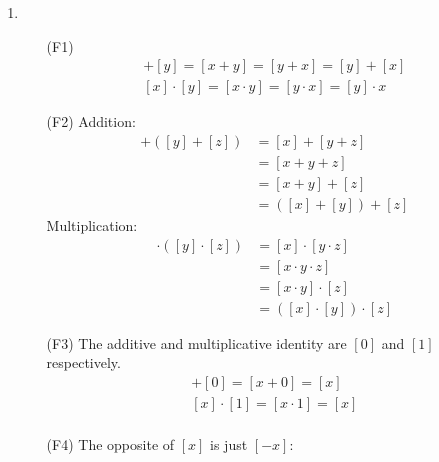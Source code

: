 \documentclass[12pt]{article}
\begin{document}
\begin{enumerate}
\begin{enumerate}
\begin{enumerate}
                    \end{enumerate}
              \item \begin{itemize}
                        \item[(F1)] \begin{gather*}
                                [x]
                                +[y]=[x+y]=[y+x]=[y]+[x]\\
                                [x]\cdot[y]=[x \cdot y]=[y \cdot x]=[y] \cdot x
                            \end{gather*}
                        \item[(F2)] Addition:
                            \begin{align*}
                                [x]
                                +([y]+[z]) & = [x]+[y+z]     \\
                                           & = [x+y+z]       \\
                                           & = [x+y]+[z]     \\
                                           & = ([x]+[y])+[z]
                            \end{align*}
                            Multiplication:
                            \begin{align*}
                                [x]
                                \cdot([y] \cdot [z]) & = [x]\cdot [y\cdot z]     \\
                                                     & = [x\cdot y\cdot z]       \\
                                                     & = [x\cdot y]\cdot[z]      \\
                                                     & = ([x]\cdot [y])\cdot [z]
                            \end{align*}
                        \item[(F3)] The additive and multiplicative identity are $[0]$ and $[1]$ respectively.
                            \begin{gather*}
                                [x]
                                + [0] = [x + 0] = [x]\\
                                [x] \cdot [1] = [x \cdot 1] = [x]\\
                            \end{gather*}
                        \item[(F4)] The opposite of $[x]$ is just $[-x]$:

\end{itemize}
\end{enumerate}
\end{enumerate}
\end{document}
